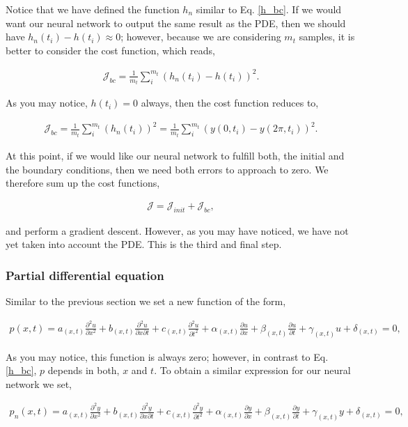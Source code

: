 \documentclass{article}
\begin{document}
Notice that we have defined the function $h_n$ similar to Eq. \eqref{h_bc}.  If we would want our neural network to output the same result as the PDE, then we should have $h_n(t_i) - h(t_i) \approx 0$; however, because we are considering $m_t$ samples, it is better to consider the cost function, which reads,

\begin{align}
\mathcal{J}_{bc}=\frac{1}{m_t}\sum_i^{m_t} (h_n(t_i) - h(t_i))^2.
\end{align}

As you may notice, $h(t_i)=0$ always, then the cost function reduces to,

\begin{align}
\mathcal{J}_{bc}=\frac{1}{m_t}\sum_i^{m_t} (h_n(t_i))^2 = \frac{1}{m_t}\sum_i^{m_t} (y(0,t_i) - y(2\pi,t_i))^2.
\end{align}

At this point, if we would like our neural network to fulfill both, the initial and the boundary conditions, then we need both errors to approach to zero. We therefore sum up the cost functions,

\begin{align}
\mathcal{J}= \mathcal{J}_{init} + \mathcal{J}_{bc},
\end{align}

and perform a gradient descent. However, as you may have noticed, we have not yet taken into account the PDE. This is the third and final step.

\subsubsection{Partial differential equation}
Similar to the previous section we set a new function of the form,

\begin{align}
\label{p_pde}
p(x,t)=a_{(x,t)}\frac{\partial^2 u}{\partial x^2}+ 
b_{(x,t)}\frac{\partial^2 u}{\partial x \partial t}+ 
c_{(x,t)}\frac{\partial^2 u}{\partial t^2}+ 
\alpha_{(x,t)}\frac{\partial u}{\partial x}+ 
\beta_{(x,t)}\frac{\partial u}{\partial t}+ 
\gamma_{(x,t)}u+ 
\delta_{(x,t)} =0,
\end{align}

As you may notice, this function is always zero; however, in contrast to Eq. \eqref{h_bc}, $p$ depends in both, $x$ and $t$. To obtain a similar expression for our neural network we set,

\begin{align}
\label{p2_pde}
p_n(x,t)=a_{(x,t)}\frac{\partial^2 y}{\partial x^2}+ 
b_{(x,t)}\frac{\partial^2 y}{\partial x \partial t}+ 
c_{(x,t)}\frac{\partial^2 y}{\partial t^2}+ 
\alpha_{(x,t)}\frac{\partial y}{\partial x}+ 
\beta_{(x,t)}\frac{\partial y}{\partial t}+ 
\gamma_{(x,t)}y+ 
\delta_{(x,t)} =0,
\end{align}
\end{document}
